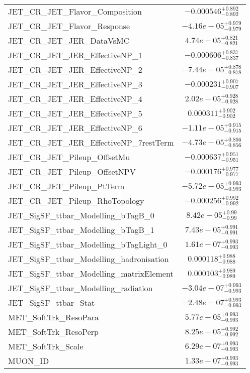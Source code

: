 \begin{tabular}{|l|c|}
JET\_CR\_JET\_Flavor\_Composition & $-0.000546^{+0.892}_{-0.892}$ \\
JET\_CR\_JET\_Flavor\_Response & $-4.16e-05^{+0.979}_{-0.979}$ \\
JET\_CR\_JET\_JER\_DataVsMC & $4.74e-05^{+0.821}_{-0.821}$ \\
JET\_CR\_JET\_JER\_EffectiveNP\_1 & $-0.000606^{+0.837}_{-0.837}$ \\
JET\_CR\_JET\_JER\_EffectiveNP\_2 & $-7.44e-05^{+0.878}_{-0.878}$ \\
JET\_CR\_JET\_JER\_EffectiveNP\_3 & $-0.000231^{+0.907}_{-0.907}$ \\
JET\_CR\_JET\_JER\_EffectiveNP\_4 & $2.02e-05^{+0.928}_{-0.928}$ \\
JET\_CR\_JET\_JER\_EffectiveNP\_5 & $0.000311^{+0.902}_{-0.902}$ \\
JET\_CR\_JET\_JER\_EffectiveNP\_6 & $-1.11e-05^{+0.915}_{-0.915}$ \\
JET\_CR\_JET\_JER\_EffectiveNP\_7restTerm & $-4.73e-05^{+0.856}_{-0.856}$ \\
JET\_CR\_JET\_Pileup\_OffsetMu & $-0.000637^{+0.951}_{-0.951}$ \\
JET\_CR\_JET\_Pileup\_OffsetNPV & $-0.000176^{+0.977}_{-0.977}$ \\
JET\_CR\_JET\_Pileup\_PtTerm & $-5.72e-05^{+0.993}_{-0.993}$ \\
JET\_CR\_JET\_Pileup\_RhoTopology & $-0.000256^{+0.992}_{-0.992}$ \\
JET\_SigSF\_ttbar\_Modelling\_bTagB\_0 & $8.42e-05^{+0.99}_{-0.99}$ \\
JET\_SigSF\_ttbar\_Modelling\_bTagB\_1 & $7.43e-05^{+0.991}_{-0.991}$ \\
JET\_SigSF\_ttbar\_Modelling\_bTagLight\_0 & $1.61e-07^{+0.993}_{-0.993}$ \\
JET\_SigSF\_ttbar\_Modelling\_hadronisation & $0.000118^{+0.988}_{-0.988}$ \\
JET\_SigSF\_ttbar\_Modelling\_matrixElement & $0.000103^{+0.989}_{-0.989}$ \\
JET\_SigSF\_ttbar\_Modelling\_radiation & $-3.04e-07^{+0.993}_{-0.993}$ \\
JET\_SigSF\_ttbar\_Stat & $-2.48e-07^{+0.993}_{-0.993}$ \\
MET\_SoftTrk\_ResoPara & $5.77e-05^{+0.993}_{-0.993}$ \\
MET\_SoftTrk\_ResoPerp & $8.25e-05^{+0.992}_{-0.992}$ \\
MET\_SoftTrk\_Scale & $6.29e-07^{+0.993}_{-0.993}$ \\
MUON\_ID & $1.33e-07^{+0.993}_{-0.993}$ \\

\end{tabular}
